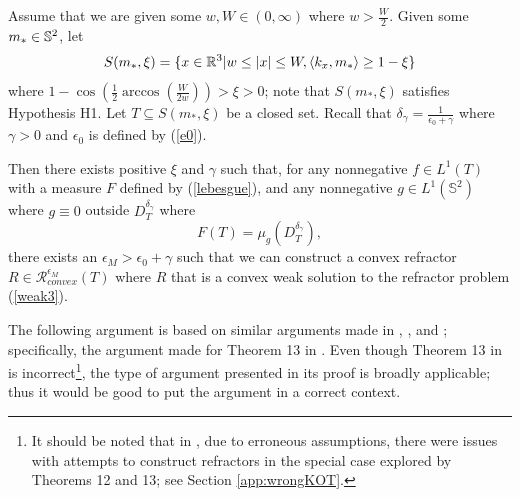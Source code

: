 \documentclass[review]{elsarticle}
\begin{document}
\begin{theorem}\label{continuous}
Assume that we are given some $w,W\in(0,\infty)$ where $w>\frac{W}2$. Given some $m_*\in \mathbb{S}^2$, let 
\begin{equation}
    S(m_*,\xi)=\{x\in\mathbb{R}^3|w\le|x|\le W, \langle k_x,m_*\rangle\ge1-\xi \}
\end{equation}
where $1-\cos\left(\frac12\arccos\left(\frac{W}{2w}\right)\right)>\xi>0$; note that $S(m_*,\xi)$ satisfies Hypothesis H1. Let $T \subseteq S(m_*,\xi)$ be a closed set. Recall that $\delta_\gamma=\frac1{\epsilon_0+\gamma}$ where $\gamma>0$ and $\epsilon_0$ is defined by (\ref{e0}).  

Then there exists positive $\xi$ and $\gamma$ such that, for any nonnegative $f\in L^1(T)$ with a measure $F$ defined by (\ref{lebesgue}), and any nonnegative $g\in L^1(\mathbb{S}^2)$ where $g\equiv 0$ outside $D_T^{\delta_\gamma}$ where
\begin{equation}
    F(T) = \mu_{g}(D_T^{\delta_\gamma}),
\end{equation}
 there exists an $\epsilon_M>\epsilon_0+\gamma$ such that we can construct a convex refractor $R \in \mathcal{R}_{convex}^{\epsilon_M} (T)$ where $R$ that is a convex weak solution to the refractor problem (\ref{weak3}).
\end{theorem}

The following argument is based on similar arguments made in \cite{KOT}, \cite{para}, and \cite{OK1}; specifically, the argument made for Theorem 13 in \cite{KOT}. Even though Theorem 13 in \cite{KOT} is incorrect\footnote{It should be noted that in \cite{KOT}, due to erroneous assumptions, there were issues with attempts to construct refractors in the special case explored by Theorems 12 and 13; see Section \ref{app:wrongKOT}.}, the type of argument presented in its proof is broadly applicable; thus it would be good to put the argument in a correct context. 
\end{document}
